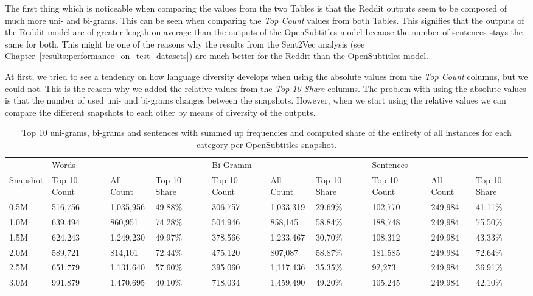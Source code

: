 The first thing which is noticeable when comparing the values from the two Tables is that the Reddit outputs seem to be composed of much more uni- and bi-grams. This can be seen when comparing the \emph{Top Count} values from both Tables. This signifies that the outputs of the Reddit model are of greater length on average than the outputs of the OpenSubtitles model because the number of sentences stays the same for both. This might be one of the reasons why the results from the Sent2Vec analysis (see Chapter~\ref{results:performance_on_test_datasets}) are much better for the Reddit than the OpenSubtitles model.

At first, we tried to see a tendency on how language diversity develops when using the absolute values from the \emph{Top Count} columns, but we could not. This is the reason why we added the relative values from the \emph{Top 10 Share} columns. The problem with using the absolute values is that the number of used uni- and bi-grams changes between the snapshots. However, when we start using the relative values we can compare the different snapshots to each other by means of diversity of the outputs. 

\begin{table}[H]
	\centering
	\begin{adjustbox}{max width=\textwidth}
		\begin{tabular}{llllllllll}
			\toprule
			& Words &&&Bi-Gramm&&&Sentences&&\\
			Snapshot & Top 10 Count & All Count& Top 10 Share &  Top 10 Count& All Count& Top 10 Share &  Top 10 Count& All Count& Top 10 Share\\
			\midrule
			0.5M & 516,756	 & 1,035,956	& 49.88\%	&306,757	&1,033,319	&29.69\%	&102,770	&249,984	&41.11\%\\
			1.0M & 639,494	 & 860,951		& 74.28\%	&504,946	&858,145	&58.84\%	&188,748	&249,984	&75.50\%\\
			1.5M & 624,243	 & 1,249,230	& 49.97\%	&378,566	&1,233,467	&30.70\%	&108,312	&249,984	&43.33\%\\
			2.0M & 589,721	 & 814,101		& 72.44\%	&475,120	&807,087	&58.87\%	&181,585	&249,984	&72.64\%\\
			2.5M & 651,779	 & 1,131,640	& 57.60\%	&395,060	&1,117,436	&35.35\%	&92,273		&249,984	&36.91\%\\
			3.0M & 991,879	 & 1,470,695	& 40.10\%	&718,034	&1,459,490	&49.20\%	&105,245	&249,984	&42.10\%\\
			\bottomrule
		\end{tabular}
	\end{adjustbox}
	\caption{Top 10 uni-grams, bi-grams and sentences with summed up frequencies and computed share of the entirety of all instances for each category per OpenSubtitles snapshot.}
	\label{results:top_10_frequency:OpenSubtitles}
\end{table}


